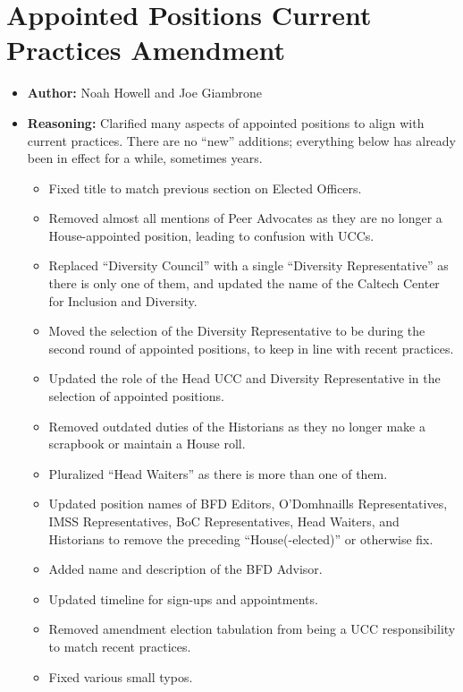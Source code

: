\documentclass[10pt]{article} %
\begin{document}
\section{Appointed Positions Current Practices Amendment}
\begin{itemize}
    \item \textbf{Author:} Noah Howell and Joe Giambrone
    \item \textbf{Reasoning:} Clarified many aspects of appointed positions to align with current practices. There are no ``new'' additions; everything below has already been in effect for a while, sometimes years.
    \begin{itemize}
        \item Fixed title to match previous section on Elected Officers.
        \item Removed almost all mentions of Peer Advocates as they are no longer a House-appointed position, leading to confusion with UCCs.
        \item Replaced ``Diversity Council'' with a single ``Diversity Representative'' as there is only one of them, and updated the name of the Caltech Center for Inclusion and Diversity.
        \item Moved the selection of the Diversity Representative to be during the second round of appointed positions, to keep in line with recent practices.
        \item Updated the role of the Head UCC and Diversity Representative in the selection of appointed positions.
        \item Removed outdated duties of the Historians as they no longer make a scrapbook or maintain a House roll.
        \item Pluralized ``Head Waiters'' as there is more than one of them.
        \item Updated position names of BFD Editors, O'Domhnaills Representatives, IMSS Representatives, BoC Representatives, Head Waiters, and Historians to remove the preceding ``House(-elected)'' or otherwise fix.
        \item Added name and description of the BFD Advisor.
        \item Updated timeline for sign-ups and appointments.
        \item Removed amendment election tabulation from being a UCC responsibility to match recent practices.
        \item Fixed various small typos.
    \end{itemize}


\end{itemize}
\end{document}
